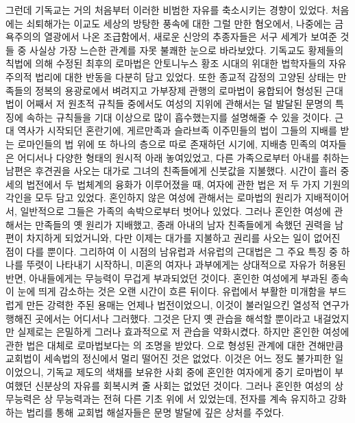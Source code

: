 그런데 기독교는 거의 처음부터 이러한 비범한 자유를 축소시키는 경향이 있었다.
처음에는 쇠퇴해가는 이교도 세상의 방탕한 풍속에 대한 그럴 만한 혐오에서,
나중에는 금욕주의의 열광에서 나온 조급함에서,
새로운 신앙의 추종자들은 서구 세계가 보여준 것들 중
사실상 가장 느슨한 관계를 자못 불쾌한 눈으로 바라보았다.
기독교도 황제들의 칙법에 의해 수정된 최후의 로마법은
안토니누스 황조 시대의 위대한 법학자들의 자유주의적 법리에 대한
반동을 다분히 담고 있었다.
또한 종교적 감정의 고양된 상태는
만족들의 정복의 용광로에서 벼려지고
가부장제 관행의 로마법이 융합되어 형성된
근대법이
어째서
저 원초적 규칙들 중에서도
여성의 지위에 관해서는
덜 발달된 문명의 특징에 속하는 규칙들을 기대 이상으로 많이 흡수했는지를
설명해줄 수 있을 것이다.
근대 역사가 시작되던 혼란기에,
게르만족과 슬라브족 이주민들의 법이
그들의 지배를 받는 로마인들의 법 위에 또 하나의 층으로 따로 존재하던 시기에,
지배층 민족의 여자들은 어디서나
다양한 형태의 원시적  아래 놓여있었고,
다른 가족으로부터 아내를 취하는 남편은
후견권을 사오는 대가로
그녀의 친족들에게
신붓값을 지불했다.
시간이 흘러 중세의 법전에서 두 법체계의 융화가 이루어졌을 때,
여자에 관한 법은 저 두 가지 기원의 각인을 모두 담고 있었다.
혼인하지 않은 여성에 관해서는
로마법의 원리가
지배적이어서,
일반적으로 
그들은 가족의 속박으로부터 벗어나 있었다.
그러나
혼인한 여성에 관해서는
만족들의 옛 원리가 지배했고,
종래 아내의 남자 친족들에게 속했던 권력을 남편이 차지하게 되었거니와,
다만 이제는 대가를 지불하고 권리를 사오는 일이 없어진 점이 다를 뿐이다.
그리하여 이 시점의 남유럽과 서유럽의 근대법은 그 주요 특징 중 하나를
뚜렷이 나타내기 시작하니,
미혼의 여자나 과부에게는 상대적으로 자유가 허용된 반면,
아내들에게는 무능력이 무겁게 부과되었던 것이다.
혼인한 여성에게 부과된 종속이 눈에 띄게 감소하는 것은 오랜 시간이 흐른 뒤이다.
유럽에서 부활한 미개함을 부드럽게 만든 강력한 주된 용매는
언제나  법전이었으니,
이것이 불러일으킨 열성적 연구가 행해진 곳에서는 어디서나 그러했다.
그것은
단지 옛 관습을 해석할 뿐이라고 내걸었지만 실제로는
은밀하게 그러나 효과적으로 저 관습을 약화시켰다.
하지만 혼인한 여성에 관한 법은 대체로 로마법보다는 의 조명을 받았다.
으로 형성된 관계에 대한 견해만큼
교회법이
세속법의 정신에서
멀리 떨어진 것은 없었다.
이것은 어느 정도 불가피한 일이었으니,
기독교 제도의 색채를 보유한 사회 중에
혼인한 여자에게 중기 로마법이 부여했던 신분상의 자유를 회복시켜 줄 사회는
없었던 것이다.
그러나 혼인한 여성의 상 무능력은 상 무능력과는 전혀 다른
기초 위에 서 있었는데,
전자를 계속 유지하고 강화하는 법리를 통해
교회법 해설자들은 문명 발달에 깊은 상처를 주었다.
